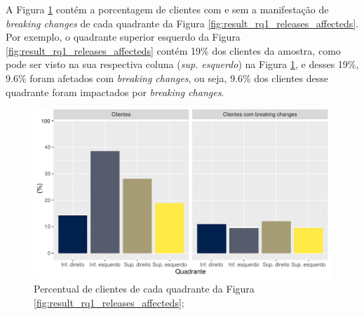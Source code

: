 A Figura \ref{fig:percentage_clients_bc} contém a porcentagem de clientes com e sem a manifestação de \textit{breaking changes} de cada quadrante da Figura \ref{fig:result_rq1_releases_affecteds}. Por exemplo, o quadrante superior esquerdo da Figura \ref{fig:result_rq1_releases_affecteds} contém 19\% dos clientes da amostra, como pode ser visto na sua respectiva coluna (\textit{sup. esquerdo}) na Figura \ref{fig:percentage_clients_bc}, e desses 19\%, 9.6\% foram afetados com \textit{breaking changes}, ou seja, 9.6\% dos clientes desse quadrante foram impactados por \textit{breaking changes}.

\begin{figure}
    \centering
    \includegraphics[scale=0.8]{figuras/percentage_clients_bc.pdf}
    \caption{Percentual de clientes de cada quadrante da Figura \ref{fig:result_rq1_releases_affecteds};}
    \label{fig:percentage_clients_bc}
\end{figure}{}


